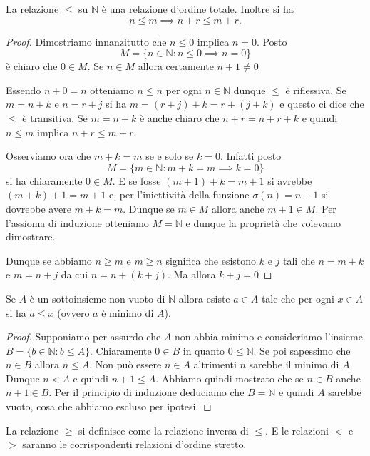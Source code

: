 \documentclass[italian,a4paper,twosides,headinclude]{scrbook}
\newcommand{\NN}{\mathbb N}
\begin{document}
\begin{theorem}
La relazione $\le$ su $\NN$ è una relazione d'ordine totale. Inoltre si ha
\[
 n\le m \implies n+r \le m+r.
\]
\end{theorem}
\begin{proof}
Dimostriamo innanzitutto che $n\le 0$ implica $n=0$. Posto
\[
  M = \{ n \in \NN \colon n\le 0 \implies n=0\}
\]
è chiaro che $0\in M$. Se $n\in M$ allora certamente $n+1\neq 0$

Essendo $n+0=n$ otteniamo $n\le n$ per ogni $n\in \NN$ dunque $\le$ è riflessiva.
Se $m=n+k$ e $n=r+j$ si ha $m=(r+j)+k = r+(j+k)$ e questo ci dice che $\le$ è transitiva.
Se $m=n+k$ è anche chiaro che $n+r=n+r+k$ e quindi $n\le m$ implica $n+r\le m+r$.

Osserviamo ora che $m+k = m$ se e solo se $k=0$. Infatti posto
\[
M=\{m\in \NN\colon m+k = m \implies k=0 \}
\]
si ha chiaramente $0\in M$. E se fosse $(m+1)+k=m+1$ si avrebbe $(m+k)+1=m+1$ e,
per l'iniettività della funzione $\sigma(n)=n+1$ si dovrebbe avere $m+k=m$.
Dunque se $m\in M$ allora anche $m+1\in M$. Per l'assioma di induzione otteniamo
$M=\NN$ e dunque la proprietà che volevamo dimostrare.

Dunque se abbiamo $n\ge m$ e $m\ge n$ significa che esistono $k$ e $j$
tali che $n=m+k$ e $m=n+j$ da cui $n=n+(k+j)$. Ma allora $k+j=0$
\end{proof}

\begin{theorem}[buon ordinamento di $\NN$]
Se $A$ è un sottoinsieme non vuoto di $\NN$ allora esiste $a \in A$
tale che per ogni $x\in A$ si ha $a\le x$ (ovvero $a$ è minimo di $A$).
\end{theorem}
%
\begin{proof}
Supponiamo per assurdo che $A$ non abbia minimo e consideriamo l'insieme
$B=\{b\in \NN\colon b \le A\}$.
Chiaramente $0\in B$ in quanto $0\le \NN$. Se poi sapessimo che $n\in B$
allora $n\le A$. Non può essere $n\in A$ altrimenti $n$ sarebbe il minimo di $A$. Dunque $n < A$ e quindi $n+1 \le A$. Abbiamo quindi mostrato che se $n\in B$ anche $n+1\in B$. Per il principio di induzione deduciamo che $B=\NN$ e quindi $A$ sarebbe vuoto, cosa che abbiamo escluso per ipotesi.
\end{proof}



La relazione $\ge$ si definisce come la relazione inversa di $\le$.
E le relazioni $<$ e $>$ saranno le corrispondenti relazioni d'ordine stretto.
\end{document}
